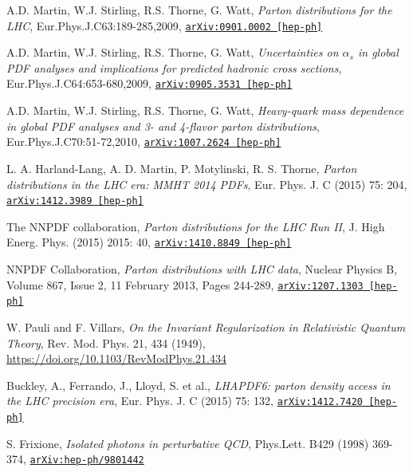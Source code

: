 \documentclass[12pt,a4paper,openright,twoside]{report}
\newcommand{\bibref}[4]{#1, \textit{#2}, #3 #4}
\begin{document}
\begin{thebibliography}{9}
	\bibref{A.D. Martin, W.J. Stirling, R.S. Thorne, G. Watt}{Parton distributions for the LHC}{Eur.Phys.J.C63:189-285,2009,}{\href{https://arxiv.org/abs/0901.0002}{\texttt{arXiv:0901.0002 [hep-ph]}}}
	
	\bibref{A.D. Martin, W.J. Stirling, R.S. Thorne, G. Watt}{Uncertainties on $\alpha_s$ in global PDF analyses and implications for predicted hadronic cross sections}{Eur.Phys.J.C64:653-680,2009,}{\href{https://arxiv.org/abs/0905.3531}{\texttt{arXiv:0905.3531 [hep-ph]}}}
	
	\bibref{A.D. Martin, W.J. Stirling, R.S. Thorne, G. Watt}{Heavy-quark mass dependence in global PDF analyses and 3- and 4-flavor parton distributions}{Eur.Phys.J.C70:51-72,2010,}{\href{https://arxiv.org/abs/1007.2624}{\texttt{arXiv:1007.2624 [hep-ph]}}}
	
	\bibref{L. A. Harland-Lang, A. D. Martin, P. Motylinski, R. S. Thorne}{Parton distributions in the LHC era: MMHT 2014 PDFs}{Eur. Phys. J. C (2015) 75: 204,}{\href{https://arxiv.org/abs/1412.3989}{\texttt{arXiv:1412.3989 [hep-ph]}}}
	
	\bibref{The NNPDF collaboration}{Parton distributions for the LHC Run II}{J. High Energ. Phys. (2015) 2015: 40,}{\href{https://arxiv.org/abs/1410.8849}{\texttt{arXiv:1410.8849 [hep-ph]}}}
	
	\bibref{NNPDF Collaboration}{Parton distributions with LHC data}{Nuclear Physics B, Volume 867, Issue 2, 11 February 2013, Pages 244-289,}{\href{https://arxiv.org/abs/1207.1303}{\texttt{arXiv:1207.1303 [hep-ph]}}}

	\bibref{W. Pauli and F. Villars}{On the Invariant Regularization in Relativistic Quantum Theory}{Rev. Mod. Phys. 21, 434 (1949),}{\url{https://doi.org/10.1103/RevModPhys.21.434}}
	
	\bibref{Buckley, A., Ferrando, J., Lloyd, S. et al.}{LHAPDF6: parton density access in the LHC precision era}{Eur. Phys. J. C (2015) 75: 132,}{\href{https://arxiv.org/abs/1412.7420}{\texttt{arXiv:1412.7420 [hep-ph]}}}

	\bibref{S. Frixione}{Isolated photons in perturbative QCD}{Phys.Lett. B429 (1998) 369-374,}{\href{https://arxiv.org/abs/hep-ph/9801442}{\texttt{arXiv:hep-ph/9801442}}}
	

\end{thebibliography}
\end{document}
